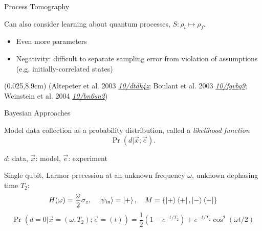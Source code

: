 \documentclass[xcolor=dvipsnames, compress]{beamer}
\renewcommand\UrlFont{\color{red}\rmfamily\itshape}
\newcommand{\shortdoi}[1]{\href{http://doi.org/#1}{\UrlFont 10/#1}}
\newcommand{\dd}{\mathrm{d}}
\newcommand{\expect}{\mathbb{E}}
\newcommand{\bottomnote}[1]{
  \begin{textblock*}{0.95\paperwidth} (0.025\paperwidth,8.9cm)
    {\tiny \hfill #1}
  \end{textblock*}
}
\begin{document}
\begin{frame}{Process Tomography}
  
  Can also consider learning about quantum processes, $S : \rho_i \mapsto \rho_f$.

  \begin{itemize}
    \item Even more parameters
    \item Negativity: difficult to separate sampling error from violation of assumptions
      (e.g. initially-correlated states)
  \end{itemize}

  \bottomnote{(Altepeter et al. 2003 \shortdoi{dtdk4z}; Boulant et al. 2003 \shortdoi{fgvbg9}; Weinstein et al. 2004 \shortdoi{bn6sn2})}

\end{frame}

\begin{frame}{Bayesian Approaches}

  Model data collection as a probability distribution, called a \emph{likelihood function}
  \[
    \Pr(d | \vec{x}; \vec{e}).
  \]
  \begin{center}
    $d$: data, \quad $\vec{x}$: model, \quad $\vec{e}$: experiment
  \end{center}

  \pause
  
  \begin{example}
    Single qubit, Larmor precession at an unknown frequency $\omega$, unknown
    dephasing time $T_2$:
    \begin{equation*}
      H(\omega) = \frac{\omega}{2} \sigma_z,\quad\ket{\psi_\text{in}} = \ket{+},\quad M = \{\ket{+}\bra{+}, \ket{-}\bra{-}\}
    \end{equation*}
    \begin{equation*}
      \Pr(d = 0 | \vec{x} = (\omega, T_2); \vec{e} = (t)) = \frac{1}{2}(1 - e^{-t / T_2}) + e^{-t / T_2} \cos^2(\omega t / 2)
    \end{equation*}

  \end{example}

\end{frame}

\end{document}
